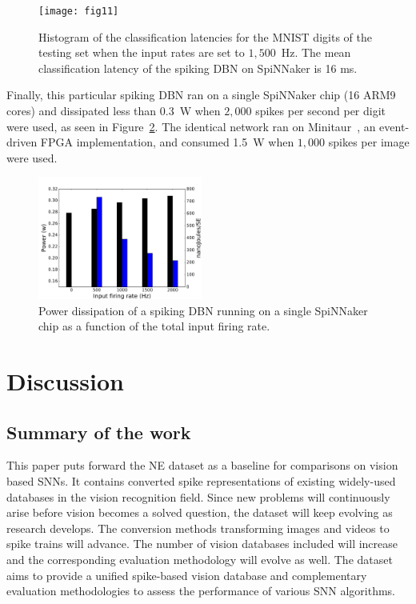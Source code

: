 \documentclass{frontiersENG} %
\begin{document}
\begin{figure}[hbt!]
	\centering
	\texttt{[image: fig11]}
	\caption{Histogram of the classification latencies for the MNIST digits of the testing set when the input rates are set to $1,500$~Hz. The mean classification latency of the spiking DBN on SpiNNaker is 16 ms.}
	\label{Fig:spinnLatency1500hz}
\end{figure} 

Finally, this particular spiking DBN ran on a single SpiNNaker chip (16 ARM9 cores) and dissipated less than 0.3~W when $2,000$ spikes per second per digit were used, as seen in Figure~\ref{Fig:spinnchipPower}. The identical network ran on Minitaur~\citep{neil2014minitaur}, an event-driven FPGA implementation, and consumed 1.5~W when $1,000$ spikes per image were used.  


\begin{figure}[hbt!]
	\centering
	\includegraphics[width=0.48\textwidth]{fig12new}
	\caption{Power dissipation of a spiking DBN running on a single SpiNNaker chip as a function of the total input firing rate.}
	\label{Fig:spinnchipPower}
\end{figure} 

\section{Discussion}
\label{sec:summ}
\subsection{Summary of the work}
This paper puts forward the NE dataset as a baseline for comparisons on vision based SNNs.
It contains converted spike representations of existing widely-used databases in the vision recognition field.
Since new problems will continuously arise before vision becomes a solved question, the dataset will keep evolving as research develops. 
The conversion methods transforming images and videos to spike trains will advance. The number of vision databases included will increase and the corresponding evaluation methodology will evolve as well.
The dataset aims to provide a unified spike-based vision database and complementary evaluation methodologies to assess the performance of various SNN algorithms.
\end{document}
